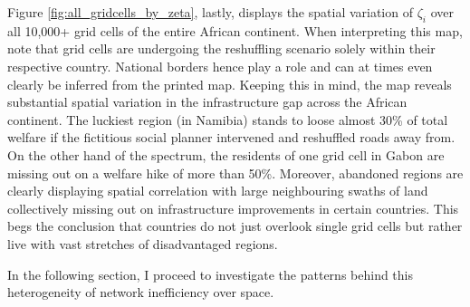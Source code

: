 \documentclass[11pt, oneside]{article}   	%
\begin{document}
Figure \ref{fig:all_gridcells_by_zeta}, lastly, displays the spatial variation of $\zeta_{i}$ over all 10,000+ grid cells of the entire African continent. When interpreting this map, note that grid cells are undergoing the reshuffling scenario solely within their respective country. National borders hence play a role and can at times even clearly be inferred from the printed map. Keeping this in mind, the map reveals substantial spatial variation in the infrastructure gap across the African continent. The luckiest region (in Namibia) stands to loose almost 30\% of total welfare if the fictitious social planner intervened and reshuffled roads away from. On the other hand of the spectrum, the residents of one grid cell in Gabon are missing out on a welfare hike of more than 50\%. Moreover, abandoned regions are clearly displaying spatial correlation with large neighbouring swaths of land collectively missing out on infrastructure improvements in certain countries. This begs the conclusion that countries do not just overlook single grid cells but rather live with vast stretches of disadvantaged regions.

In the following section, I proceed to investigate the patterns behind this heterogeneity of network inefficiency over space.


\newpage
\begin{spacing}{1.0}
\setlength{\bibsep}{2.5pt plus 1.5ex}

\end{spacing}
\end{document}

